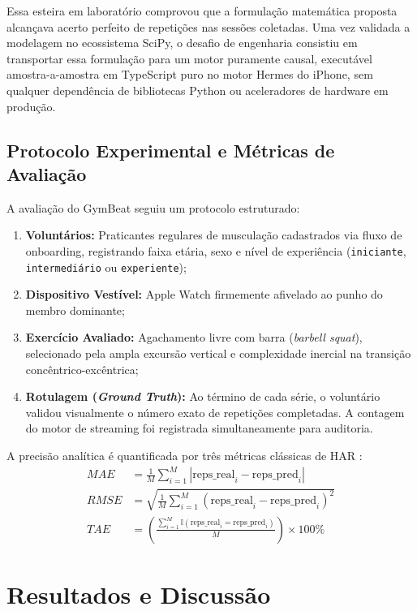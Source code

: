 \documentclass[12pt]{article}
\begin{document}
Essa esteira em laboratório comprovou que a formulação matemática proposta alcançava acerto perfeito de repetições nas sessões coletadas. Uma vez validada a modelagem no ecossistema SciPy, o desafio de engenharia consistiu em transportar essa formulação para um motor puramente causal, executável amostra-a-amostra em TypeScript puro no motor Hermes do iPhone, sem qualquer dependência de bibliotecas Python ou aceleradores de hardware em produção.

\subsection{Protocolo Experimental e Métricas de Avaliação}

A avaliação do GymBeat seguiu um protocolo estruturado:
\begin{enumerate}
    \item \textbf{Voluntários:} Praticantes regulares de musculação cadastrados via fluxo de onboarding, registrando faixa etária, sexo e nível de experiência (\texttt{iniciante}, \texttt{intermediário} ou \texttt{experiente});
    \item \textbf{Dispositivo Vestível:} Apple Watch firmemente afivelado ao punho do membro dominante;
    \item \textbf{Exercício Avaliado:} Agachamento livre com barra (\textit{barbell squat}), selecionado pela ampla excursão vertical e complexidade inercial na transição concêntrico-excêntrica;
    \item \textbf{Rotulagem (\textit{Ground Truth}):} Ao término de cada série, o voluntário validou visualmente o número exato de repetições completadas. A contagem do motor de streaming foi registrada simultaneamente para auditoria.
\end{enumerate}

A precisão analítica é quantificada por três métricas clássicas de HAR \cite{shoeb2021}:
\begin{align}
MAE &= \frac{1}{M} \sum_{i=1}^M |\text{reps\_real}_i - \text{reps\_pred}_i| \\
RMSE &= \sqrt{\frac{1}{M} \sum_{i=1}^M (\text{reps\_real}_i - \text{reps\_pred}_i)^2} \\
TAE &= \left( \frac{\sum_{i=1}^M \mathbb{I}(\text{reps\_real}_i = \text{reps\_pred}_i)}{M} \right) \times 100\%
\end{align}

\section{Resultados e Discussão}
\end{document}
